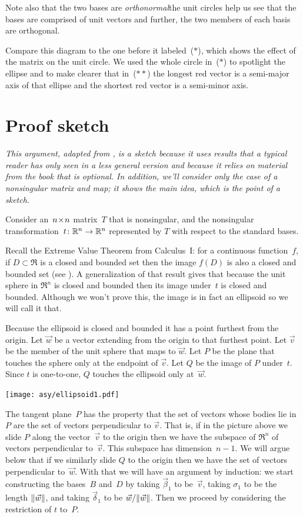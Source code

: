 Note also that the two bases are \textit{orthonormal}\Dash the unit circles help
us see that the bases are comprised of unit vectors and further,
the two members of each basis are orthogonal.

Compare this diagram to the one before it 
labeled~($*$), which shows the effect of the matrix
on the unit circle.
We used the whole circle in~($*$) to spotlight the ellipse and 
to make clearer that in~($**$)
the longest red vector is a
semi-major axis of that ellipse and the shortest red vector is a 
semi-minor axis.



\section{Proof sketch}

\textit{This argument, 
adapted from \cite{BlankKrikorianSpring89},
is a sketch because it uses results that a typical reader has only 
seen in a less general version and because it relies on material from the
book that is optional.
In addition, we'll consider only the case of a nonsingular matrix and map;
it shows the main idea, which is the point of a sketch.}

Consider an~$n \! \times \! n$ matrix~$T$ that is nonsingular, and the
nonsingular transformation~$\mbox{$t\colon \mathbb{R}^n\to \mathbb{R}^n$}$ represented by
$T$ with respect to the standard bases.

Recall the Extreme Value Theorem from Calculus~I: for a continuous
function~$f$, if $D\subset \Re$ is a closed and bounded set then
the image $f(D)$ is also a closed and bounded 
set (see \cite{wiki:ExtremeValueThm}).
A generalization of that result gives that because the unit sphere in $\Re^n$
is closed and bounded then its image under~$t$ is closed and bounded.
Although we won't prove this, the image is in fact an ellipsoid
so we will call it that. 

Because the ellipsoid is closed and bounded it has a point furthest from the
origin.
Let $\vec{w}$ be a vector extending from the origin to that furthest point.
Let $\vec{v}$ be the member of the unit sphere that maps to $\vec{w}$.
Let $P$ be the plane that touches the sphere only at the endpoint of $\vec{v}$.
Let $Q$ be the image of $P$ under~$t$.
Since $t$ is one-to-one, $Q$ touches the ellipsoid only at~$\vec{w}$.
\begin{center}
  \texttt{[image: asy/ellipsoid1.pdf]}
\end{center}

The tangent plane~$P$ has the property that 
the set of vectors whose bodies lie in~$P$
are the set of vectors perpendicular to $\vec{v}$.
That is, if in the picture above we slide $P$ along the vector~$\vec{v}$ to
the origin then we have the subspace of $\Re^n$ of vectors perpendicular
to~$\vec{v}$.
This subspace has dimension~$n-1$. 
We will argue below 
that if we similarly slide $Q$ to the origin then we have the
set of vectors perpendicular to~$\vec{w}$.
With that we will have an argument by induction: we start constructing the 
bases~$B$ and~$D$ by taking $\vec{\beta}_1$ to be~$\vec{v}$, taking
$\sigma_1$ to be the length $\|\vec{w}\|$, and taking
$\vec{\delta}_1$ to be $\vec{w}/\|\vec{w}\|$.
Then we proceed by considering the restriction of $t$ to~$P$.

